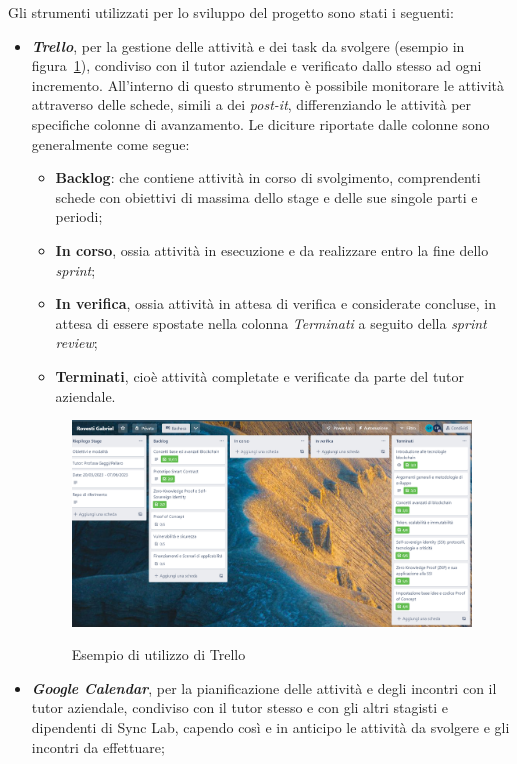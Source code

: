 Gli strumenti utilizzati per lo sviluppo del progetto sono stati i seguenti:
\begin{itemize}
    \item{\textit{\textbf{Trello}}}, per la gestione delle attività e dei task da svolgere (esempio in figura~\ref{fig:trello}), condiviso con il tutor aziendale e verificato dallo stesso ad ogni incremento.
    All'interno di questo strumento è possibile monitorare le attività attraverso delle schede, simili a dei \textit{post-it}, differenziando le attività per specifiche colonne di avanzamento.
    Le diciture riportate dalle colonne sono generalmente come segue:
    \begin{itemize}
        \item{\textbf{Backlog}}: che contiene attività in corso di svolgimento, comprendenti schede con obiettivi di massima dello stage e delle sue singole parti e periodi;
        \item{\textbf{In corso}}, ossia attività in esecuzione e da realizzare entro la fine dello \textit{sprint};
        \item{\textbf{In verifica}}, ossia attività in attesa di verifica e considerate concluse, in attesa di essere spostate nella colonna \textit{Terminati} a seguito della \textit{sprint review};
        \item{\textbf{Terminati}}, cioè attività completate e verificate da parte del tutor aziendale.
    \end{itemize} 
    \begin{figure}[h]
        \centering
        \includegraphics[width=1\textwidth, alt={Esempio di utilizzo di Trello}]{immagini/trello.png}
        \caption{Esempio di utilizzo di Trello}\label{fig:trello}
    \end{figure}

    \item{\textit{\textbf{Google Calendar}}}, per la pianificazione delle attività e degli incontri con il tutor aziendale, condiviso con il tutor stesso e con gli altri stagisti 
    e dipendenti di Sync Lab, capendo così e in anticipo le attività da svolgere e gli incontri da effettuare;
    

\end{itemize}
